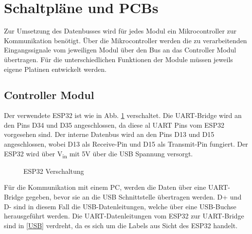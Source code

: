 \section{Schaltpläne und PCBs}

Zur Umsetzung des Datenbusses wird für jedes Modul ein Mikrocontroller zur Kommunikation benötigt. 
Über die Mikrocontroller werden die zu verarbeitenden Eingangssignale vom jeweiligen Modul über den Bus an das Controller Modul übertragen. Für die 
unterschiedlichen Funktionen der Module müssen jeweils eigene Platinen entwickelt werden. 


\subsection{Controller Modul}
Der verwendete ESP32 ist wie in Abb. \ref{ESP} verschaltet. Die UART-Bridge wird an den Pins D34 und D35 angeschlossen, da diese al UART Pins vom ESP32 vorgesehen sind. Der interne Datenbus wird an den Pins D13 und D15 angeschlossen, wobei D13 als Receive-Pin und D15 als Transmit-Pin fungiert. Der ESP32 wird über V\textsubscript{in} mit 5V über die USB Spannung versorgt.

\begin{figure}[H]
    \centering    
    \caption{ESP32 Verschaltung}
    \label{ESP}
\end{figure}

Für die Kommunikation mit einem PC, werden die Daten über eine UART-Bridge gegeben, bevor sie an die USB Schnittstelle übertragen werden. D+ und D- sind in diesem Fall die USB-Datenleitungen, welche über eine USB-Buchse herausgeführt werden. Die UART-Datenleitungen vom ESP32 zur UART-Bridge sind in \ref{USB} verdreht, da es sich um die Labels aus Sicht des ESP32 handelt.


